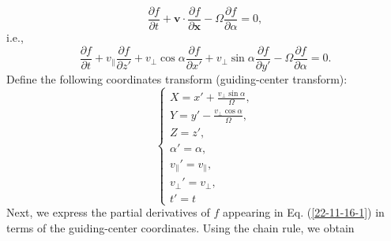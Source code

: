 \documentclass{article}
\begin{document}
\begin{equation}
  \frac{\partial f}{\partial t} +\mathbf{v} \cdot \frac{\partial f}{\partial
  \mathbf{x}} - \Omega \frac{\partial f}{\partial \alpha} = 0,
\end{equation}
i.e.,
\begin{equation}
  \label{22-11-16-1} \frac{\partial f}{\partial t} + v_{\parallel}
  \frac{\partial f}{\partial z'} + v_{\perp} \cos \alpha \frac{\partial
  f}{\partial x'} + v_{\perp} \sin \alpha \frac{\partial f}{\partial y'} -
  \Omega \frac{\partial f}{\partial \alpha} = 0.
\end{equation}
Define the following coordinates transform (guiding-center transform):
\begin{equation}
  \left\{ \begin{array}{l}
    X = x' + \frac{v_{\perp} \sin \alpha}{\Omega},\\
    Y = y' - \frac{v_{\perp} \cos \alpha}{\Omega},\\
    Z = z',\\
    \alpha' = \alpha,\\
    v_{\parallel}' = v_{\parallel},\\
    v_{\perp}' = v_{\perp},\\
    t' = t
  \end{array} \right.
\end{equation}
Next, we express the partial derivatives of $f$ appearing in Eq.
(\ref{22-11-16-1}) in terms of the guiding-center coordinates. Using the chain
rule, we obtain
\end{document}
